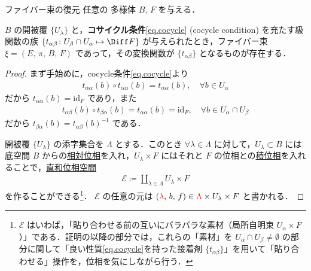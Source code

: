 \documentclass[geometry_main]{subfiles}
\begin{document}
\begin{myprop}[label=prop.cocycle]{ファイバー束の復元}
	任意の \cinfty 多様体 $B,\, F$ を与える．

	$B$ の開被覆 $\{U_\lambda\}$ と，\textbf{コサイクル条件}\eqref{eq.cocycle} (cocycle condition) を充たす\cinfty 級関数の族 $\{ t_{\alpha\beta} \colon U_\beta \cap U_\alpha \mapsto \Diff F \}$ が与えられたとき，ファイバー束 $\xi = (E,\, \pi,\, B,\, F)$ であって，その変換関数が $\{t_{\alpha\beta}\}$ となるものが存在する．
\end{myprop}
\begin{proof}
	まず手始めに，cocycle条件\eqref{eq.cocycle}より
	\begin{align}
		t_{\alpha\alpha}(b) \circ t_{\alpha\alpha} (b ) = t_{\alpha\alpha}(b),\quad \forall b \in U_\alpha
	\end{align}
	だから $t_{\alpha\alpha}(b) = \mathrm{id}_{F}$ であり，また
	\begin{align}
		t_{\alpha\beta}(b) \circ t_{\beta\alpha} (b) = t_{\alpha\alpha}(b) = \mathrm{id}_{F},\quad \forall b \in U_\alpha \cap U_\beta
	\end{align}
	だから $t_{\beta\alpha}(b) = t_{\alpha\beta}(b)^{-1}$ である．

	開被覆 $\{U_\lambda\}$ の添字集合を $\Lambda$ とする．このとき $\forall \lambda \in \Lambda$ に対して，$U_\lambda \subset B$ には底空間 $B$ からの\hyperref[def.reltopo]{相対位相}を入れ，$U_\lambda \times F$ にはそれと $F$ の位相との\hyperref[def.prodtopo]{積位相}を入れることで，\hyperref[def.disjoint_topo]{直和位相空間}
	\begin{align}
	\mathcal{E} \coloneqq \coprod_{\lambda \in \Lambda} U_\lambda \times F
	\end{align}
	を作ることができる\footnote{$\mathcal{E}$ はいわば，「貼り合わせる前の互いにバラバラな素材（局所自明束 $U_\alpha \times F$）」である．証明の以降の部分では，これらの「素材」を $U_\alpha \cap U_\beta \neq \emptyset$ の部分に関して「良い性質\eqref{eq.cocycle}を持った接着剤 $\{ t_{\alpha\beta} \}$」を用いて「貼り合わせる」操作を，位相を気にしながら行う．}．
	$\mathcal{E}$ の任意の元は $(\textcolor{red}{\lambda},\, b,\, f) \in  \textcolor{red}{\Lambda} \times  U_\lambda \times F$ と書かれる．


\end{proof}
\end{document}
